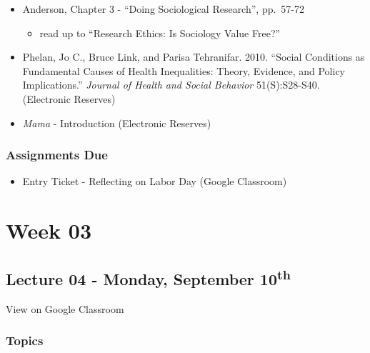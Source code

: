 \documentclass[]{book}
\providecommand{\tightlist}{%
  \setlength{\itemsep}{0pt}\setlength{\parskip}{0pt}}
\theoremstyle{definition}
\theoremstyle{definition}
\theoremstyle{definition}
\theoremstyle{remark}
\begin{document}
\begin{itemize}
\tightlist
\item
  Anderson, Chapter 3 - ``Doing Sociological Research'', pp.~57-72

  \begin{itemize}
  \tightlist
  \item
    read up to ``Research Ethics: Is Sociology Value Free?''
  \end{itemize}
\item
  Phelan, Jo C., Bruce Link, and Parisa Tehranifar. 2010. ``Social
  Conditions as Fundamental Causes of Health Inequalities: Theory,
  Evidence, and Policy Implications.'' \emph{Journal of Health and
  Social Behavior} 51(S):S28-S40. (Electronic Reserves)
\item
  \emph{Mama} - Introduction (Electronic Reserves)
\end{itemize}

\hypertarget{assignments-due-1}{%
\subsubsection*{Assignments Due}\label{assignments-due-1}}

\begin{itemize}
\tightlist
\item
  Entry Ticket - Reflecting on Labor Day (Google Classroom)
\end{itemize}

\hypertarget{week-03}{%
\section*{Week 03}\label{week-03}}

\hypertarget{lecture-04---monday-september-10th}{%
\subsection*{\texorpdfstring{Lecture 04 - Monday, September
10\textsuperscript{th}}{Lecture 04 - Monday, September 10th}}\label{lecture-04---monday-september-10th}}

View on Google Classroom

\hypertarget{topics-4}{%
\subsubsection*{Topics}\label{topics-4}}
\end{document}
